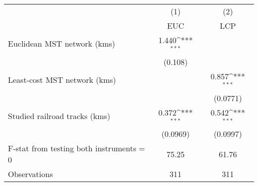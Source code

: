 {
\def\sym#1{\ifmmode^{#1}\else\(^{#1}\)\fi}
\begin{tabular}{l*{2}{c}}
\hline\hline
                &\multicolumn{1}{c}{(1)}&\multicolumn{1}{c}{(2)}\\
                &\multicolumn{1}{c}{EUC}&\multicolumn{1}{c}{LCP}\\
\hline
Euclidean MST network (kms)&    1.440\sym{***}&                  \\
                &  (0.108)         &                  \\
[1em]
Least-cost MST network (kms)&                  &    0.857\sym{***}\\
                &                  & (0.0771)         \\
[1em]
Studied railroad tracks (kms)&    0.372\sym{***}&    0.542\sym{***}\\
                & (0.0969)         & (0.0997)         \\
\hline
F-stat from testing both instruments = 0&    75.25         &    61.76         \\
Observations    &      311         &      311         \\
\hline\hline
\end{tabular}
}
